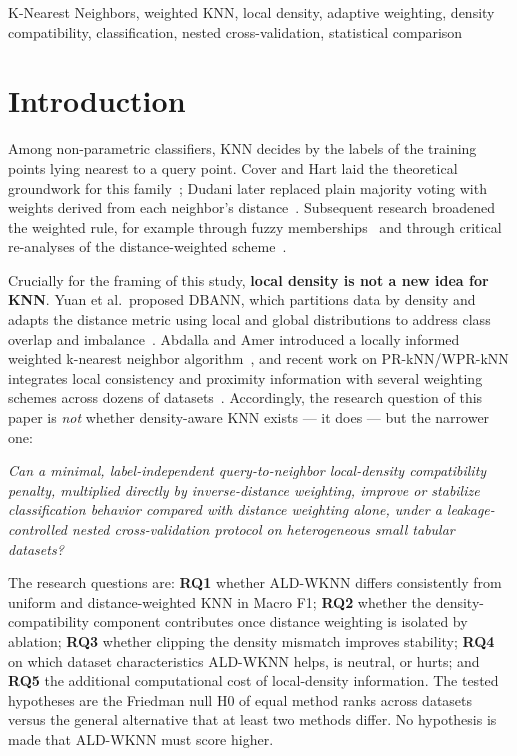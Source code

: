 \documentclass[conference]{IEEEtran}
\begin{document}
\begin{IEEEkeywords}
K-Nearest Neighbors, weighted KNN, local density, adaptive weighting, density compatibility, classification, nested cross-validation, statistical comparison
\end{IEEEkeywords}

\section{Introduction}

Among non-parametric classifiers, KNN decides by the labels of the training points lying nearest to a query point. Cover and Hart laid the theoretical groundwork for this family~\cite{coverhart1967}; Dudani later replaced plain majority voting with weights derived from each neighbor's distance~\cite{dudani1976}. Subsequent research broadened the weighted rule, for example through fuzzy memberships~\cite{keller1985} and through critical re-analyses of the distance-weighted scheme~\cite{macleod1987}.

Crucially for the framing of this study, \textbf{local density is not a new idea for KNN}. Yuan et al.\ proposed DBANN, which partitions data by density and adapts the distance metric using local and global distributions to address class overlap and imbalance~\cite{yuan2021}. Abdalla and Amer introduced a locally informed weighted k-nearest neighbor algorithm~\cite{abdalla2025}, and recent work on PR-kNN/WPR-kNN integrates local consistency and proximity information with several weighting schemes across dozens of datasets~\cite{amer2025effective}. Accordingly, the research question of this paper is \emph{not} whether density-aware KNN exists --- it does --- but the narrower one:

\medskip
\noindent\emph{Can a minimal, label-independent query-to-neighbor local-density compatibility penalty, multiplied directly by inverse-distance weighting, improve or stabilize classification behavior compared with distance weighting alone, under a leakage-controlled nested cross-validation protocol on heterogeneous small tabular datasets?}
\medskip

The research questions are: \textbf{RQ1} whether ALD-WKNN differs consistently from uniform and distance-weighted KNN in Macro F1; \textbf{RQ2} whether the density-compatibility component contributes once distance weighting is isolated by ablation; \textbf{RQ3} whether clipping the density mismatch improves stability; \textbf{RQ4} on which dataset characteristics ALD-WKNN helps, is neutral, or hurts; and \textbf{RQ5} the additional computational cost of local-density information. The tested hypotheses are the Friedman null H0 of equal method ranks across datasets versus the general alternative that at least two methods differ. No hypothesis is made that ALD-WKNN must score higher.
\end{document}
